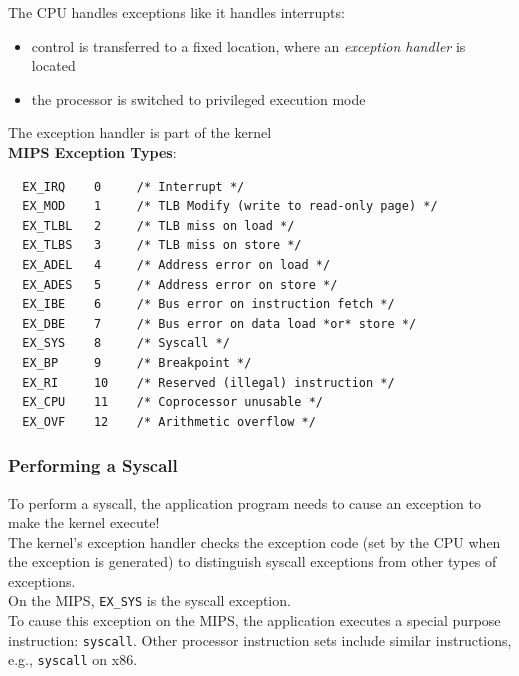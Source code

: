 \documentclass[12pt]{article}
\theoremstyle{plain}
\theoremstyle{definition}
\begin{document}
The CPU handles exceptions like it handles interrupts:
\begin{itemize}
  \item control is transferred to a fixed location, where an \emph{exception handler} is located
  \item the processor is switched to privileged execution mode
\end{itemize}
The exception handler is part of the kernel \\

\textbf{MIPS Exception Types}:
\begin{verbatim}
  EX_IRQ    0     /* Interrupt */
  EX_MOD    1     /* TLB Modify (write to read-only page) */
  EX_TLBL   2     /* TLB miss on load */
  EX_TLBS   3     /* TLB miss on store */
  EX_ADEL   4     /* Address error on load */
  EX_ADES   5     /* Address error on store */
  EX_IBE    6     /* Bus error on instruction fetch */
  EX_DBE    7     /* Bus error on data load *or* store */
  EX_SYS    8     /* Syscall */
  EX_BP     9     /* Breakpoint */
  EX_RI     10    /* Reserved (illegal) instruction */
  EX_CPU    11    /* Coprocessor unusable */
  EX_OVF    12    /* Arithmetic overflow */
\end{verbatim}

\subsubsection{Performing a Syscall}
To perform a syscall, the application program needs to cause an exception to make the kernel execute! \\
The kernel's exception handler checks the exception code (set by the CPU when the exception is generated) to distinguish syscall exceptions from other types of exceptions. \\

On the MIPS, \texttt{EX\_SYS} is the syscall exception. \\
To cause this exception on the MIPS, the application executes a special purpose instruction: \texttt{syscall}.
Other processor instruction sets include similar instructions, e.g., \texttt{syscall} on x86.
\end{document}

